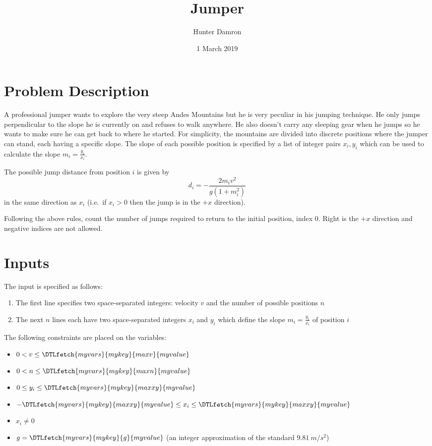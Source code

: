 \documentclass{article}
\title{Jumper}
\author{Hunter Damron}
\date{1 March 2019}
\newcommand{\var}[1]{\DTLfetch{myvars}{mykey}{#1}{myvalue}}
\begin{document}
	\maketitle

	\section*{Problem Description}
	\noindent
	A professional jumper wants to explore the very steep Andes Mountains but he is very peculiar in his jumping technique. He only jumps perpendicular to the slope he is currently on and refuses to walk anywhere. He also doesn't carry any sleeping gear when he jumps so he wants to make sure he can get back to where he started. For simplicity, the mountains are divided into discrete positions where the jumper can stand, each having a specific slope. The slope of each possible position is specified by a list of integer pairs $x_i, y_i$ which can be used to calculate the slope $m_i = \frac{y_i}{x_i}$.

	The possible jump distance from position $i$ is given by
	\[ d_i = -\frac{2 m_i v^2}{g (1+m_i^2)} \]
	in the same direction as $x_i$ (i.e.\ if $x_i > 0$ then the jump is in the $+x$ direction).

	Following the above rules, count the number of jumps required to return to the initial position, index 0. Right is the $+x$ direction and negative indices are not allowed.

	\section*{Inputs}
	The input is specified as follows:
	\begin{enumerate}
		\item The first line specifies two space-separated integers: velocity $v$ and the number of possible positions $n$
		\item The next $n$ lines each have two space-separated integers $x_i$ and $y_i$ which define the slope $m_i = \frac{y_i}{x_i}$ of position $i$
	\end{enumerate}

	\noindent
	The following constraints are placed on the variables:
	\begin{itemize}
		\item $0 < v \leq \var{maxv}$
		\item $0 < n \leq \var{maxn}$

		\item $0 \leq y_i \leq \var{maxxy}$
		\item $-\var{maxxy} \leq x_i \leq \var{maxxy}$
		\item $x_i \neq 0$

		\item $g = \var{g}$ (an integer approximation of the standard $9.81~m/s^2$)
	\end{itemize}
\end{document}
